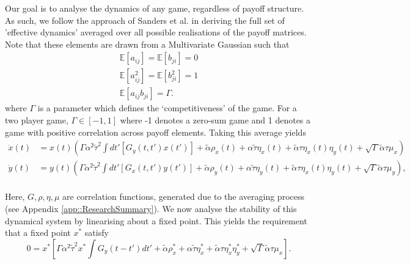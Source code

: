 \documentclass[.../main.tex]{subfiles}
\begin{document}
    Our goal is to analyse the dynamics of any game, regardless of
    payoff structure. As such, we follow the approach of Sanders et
    al. in deriving the full set of 'effective dynamics' averaged over
    all possible realisations of the payoff matrices. Note that these
    elements are drawn from a Multivariate Gaussian such that
    \begin{equation*}
        \begin{split}
            \mathbb{E}[a_{ij}] = \mathbb{E}[b_{ji}] = 0\\
            \mathbb{E}[a_{ij}^2] = \mathbb{E}[b_{ji}^2] = 1\\
            \mathbb{E}[a_{ij} b_{ji}] = \Gamma.
        \end{split}
    \end{equation*}
    where $\Gamma$ is a parameter which defines the `competitiveness' of the game. For a two player
    game, $\Gamma \in [-1, 1]$ where -1 denotes a zero-sum game and 1 denotes a game with positive
    correlation across payoff elements. Taking this average  yields
%
    \begin{equation}
    \begin{split}
        \dot{x}(t) &= x(t)(\Gamma \alpha^2 \tilde{\tau}^2 \int dt'[G_y(t, t')x(t')] + 
        \tilde{\alpha}
        \rho_x(t) + \alpha \tilde{\tau} \eta_x(t) + \tilde{\alpha} \tau \eta_x(t) \eta_y(t) +
        \sqrt{\Gamma} \tilde{\alpha} \tau \mu_x) \\
        \dot{y}(t) &= y(t)(\Gamma \alpha^2 \tilde{\tau}^2 \int dt'[G_x(t, t')y(t')] + 
        \tilde{\alpha} \rho_y(t) +
        \alpha \tilde{\tau} \eta_y(t) + \tilde{\alpha} \tau \eta_x(t) \eta_y(t)+ 
        \sqrt{\Gamma} \tilde{\alpha} \tau \mu_y), \\
    \end{split}
    \end{equation}

    Here, $G, \rho, \eta, \mu$ are correlation functions, generated
    due to the averaging process (see Appendix
    \ref{app::ResearchSummary}). We now analyse the stability of this
    dynamical system by linearising about a fixed point. This yields
    the requirement that a fixed point $x^*$ satisfy
%
    \begin{equation}
    0 = x^* \left[\Gamma \alpha^2 \tilde{\tau}^2 x^* \int G_y(t - t') dt' + \tilde{\alpha} \rho_x^* + \alpha \tilde{\tau} \eta_x^* + \tilde{\alpha} \tau \eta_x^* \eta_y^* + \sqrt{\Gamma} \tilde{\alpha} \tau \mu_x \right].
    \end{equation}
\end{document}
